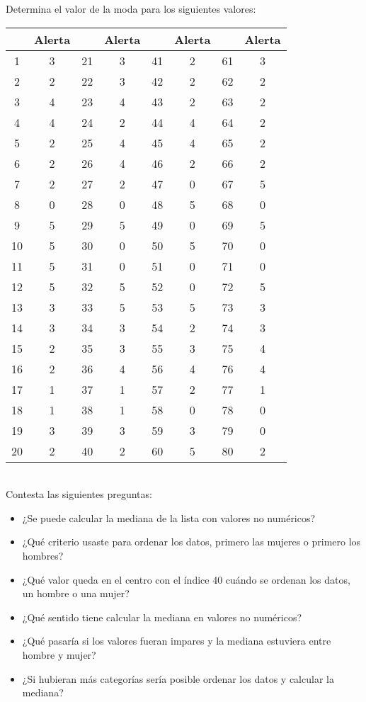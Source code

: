 \documentclass{article}
\begin{document}
Determina el valor de la moda para los siguientes valores:
\begin{table}[!h]
    \centering
    \begin{tabular}{|c|c|c|c|c|c|c|c|}
        \hline
        \textbf{} & \textbf{Alerta} & \textbf{} & \textbf{Alerta} & \textbf{} & \textbf{Alerta} & \textbf{} & \textbf{Alerta} \\ \hline
        1  & 3  & 21 & 3 & 41 & 2 & 61 & 3 \\ \hline
        2  & 2  & 22 & 3 & 42 & 2 & 62 & 2 \\ \hline
        3  & 4  & 23 & 4 & 43 & 2 & 63 & 2 \\ \hline
        4  & 4  & 24 & 2 & 44 & 4 & 64 & 2 \\ \hline
        5  & 2  & 25 & 4 & 45 & 4 & 65 & 2 \\ \hline
        6  & 2  & 26 & 4 & 46 & 2 & 66 & 2 \\ \hline
        7  & 2  & 27 & 2 & 47 & 0 & 67 & 5 \\ \hline
        8  & 0  & 28 & 0 & 48 & 5 & 68 & 0 \\ \hline
        9  & 5  & 29 & 5 & 49 & 0 & 69 & 5 \\ \hline
        10 & 5  & 30 & 0 & 50 & 5 & 70 & 0 \\ \hline
        11 & 5  & 31 & 0 & 51 & 0 & 71 & 0 \\ \hline
        12 & 5  & 32 & 5 & 52 & 0 & 72 & 5 \\ \hline
        13 & 3  & 33 & 5 & 53 & 5 & 73 & 3 \\ \hline
        14 & 3  & 34 & 3 & 54 & 2 & 74 & 3 \\ \hline
        15 & 2  & 35 & 3 & 55 & 3 & 75 & 4 \\ \hline
        16 & 2  & 36 & 4 & 56 & 4 & 76 & 4 \\ \hline
        17 & 1  & 37 & 1 & 57 & 2 & 77 & 1 \\ \hline
        18 & 1  & 38 & 1 & 58 & 0 & 78 & 0 \\ \hline
        19 & 3  & 39 & 3 & 59 & 3 & 79 & 0 \\ \hline
        20 & 2  & 40 & 2 & 60 & 5 & 80 & 2 \\ \hline
    \end{tabular}
\end{table}
\\
Contesta las siguientes preguntas:
\begin{itemize}
    \item ¿Se puede calcular la mediana de la lista con valores no numéricos?
    \item ¿Qué criterio usaste para ordenar los datos, primero las mujeres o primero los hombres?
    \item ¿Qué valor queda en el centro con el índice 40 cuándo se ordenan los datos, un hombre o una mujer?
    \item ¿Qué sentido tiene calcular la mediana en valores no numéricos?
    \item ¿Qué pasaría si los valores fueran impares y la mediana estuviera entre hombre y mujer?
    \item ¿Si hubieran más categorías sería posible ordenar los datos y calcular la mediana?
\end{itemize}
\end{document}
